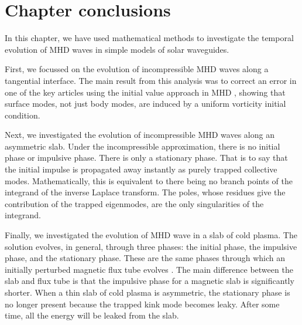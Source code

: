 \section{Chapter conclusions}
In this chapter, we have used mathematical methods to investigate the temporal evolution of MHD waves in simple models of solar waveguides.

First, we focussed on the evolution of incompressible MHD waves along a tangential interface. The main result from this analysis was to correct an error in one of the key articles using the initial value approach in MHD \citep{rae_etal81}, showing that surface modes, not just body modes, are induced by a uniform vorticity initial condition.

Next, we investigated the evolution of incompressible MHD waves along an asymmetric slab. Under the incompressible approximation, there is no initial phase or impulsive phase. There is only a stationary phase. That is to say that the initial impulse is propagated away instantly as purely trapped collective modes. Mathematically, this is equivalent to there being no branch points of the integrand of the inverse Laplace transform. The poles, whose residues give the contribution of the trapped eigenmodes, are the only singularities of the integrand.

Finally, we investigated the evolution of MHD wave in a slab of cold plasma. The solution evolves, in general, through three phases: the initial phase, the impulsive phase, and the stationary phase. These are the same phases through which an initially perturbed magnetic flux tube evolves \citep{rud_etal06b}. The main difference between the slab and flux tube is that the impulsive phase for a magnetic slab is significantly shorter. When a thin slab of cold plasma is asymmetric, the stationary phase is no longer present because the trapped kink mode becomes leaky. After some time, all the energy will be leaked from the slab.